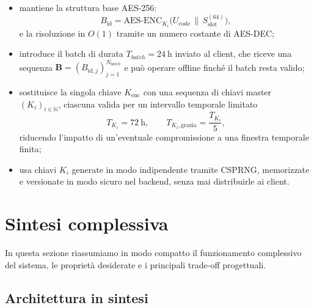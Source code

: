 \documentclass[a4paper,11pt]{article}
\begin{document}
\begin{itemize}[nosep]
  \item mantiene la struttura base AES-256:
        \[
          B_{\text{id}} = \mathrm{AES\text{-}ENC}_{K_i}
          \bigl(U_{\text{code}} \,\|\, S_{\text{slot}}^{(64)}\bigr),
        \]
        e la risoluzione in \(O(1)\) tramite un numero costante di AES-DEC;
  \item introduce il batch di durata \(T_{batch} = \SI{24}{\hour}\) inviato al client, che riceve
        una sequenza
        \(\mathbf{B} = (B_{\text{id},j})_{j=1}^{N_{batch}}\) e può operare offline finché il batch
        resta valido;
  \item sostituisce la singola chiave \(K_{\text{enc}}\) con una sequenza di chiavi master
        \((K_i)_{i \in \mathbb{N}}\), ciascuna valida per un intervallo temporale limitato
        \[
          T_{K_i} = \SI{72}{\hour},
          \qquad
          T_{K_i,\mathrm{grazia}} = \frac{T_{K_i}}{5},
        \]
        riducendo l’impatto di un’eventuale compromissione a una finestra temporale finita;
  \item usa chiavi \(K_i\) generate in modo indipendente tramite CSPRNG, memorizzate e versionate
        in modo sicuro nel backend, senza mai distribuirle ai client.
\end{itemize}

\section{Sintesi complessiva}

In questa sezione riassumiamo in modo compatto il funzionamento complessivo del sistema, le
proprietà desiderate e i principali trade-off progettuali.

\subsection{Architettura in sintesi}
\end{document}
